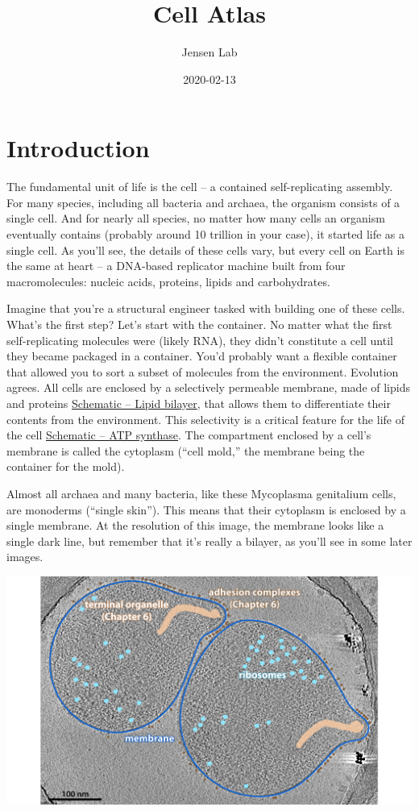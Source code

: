 \documentclass[]{tufte-book}
\title{Cell Atlas}
\author{Jensen Lab}
\date{2020-02-13}
\begin{document}
\maketitle



{
\setcounter{tocdepth}{1}
\tableofcontents
}

\hypertarget{bilayer}{\chapter{Introduction}\label{bilayer}}

The fundamental unit of life is the cell -- a contained self-replicating
assembly. For many species, including all bacteria and archaea, the
organism consists of a single cell. And for nearly all species, no
matter how many cells an organism eventually contains (probably around
10 trillion in your case), it started life as a single cell. As you'll
see, the details of these cells vary, but every cell on Earth is the
same at heart -- a DNA-based replicator machine built from four
macromolecules: nucleic acids, proteins, lipids and carbohydrates.

Imagine that you're a structural engineer tasked with building one of
these cells. What's the first step? Let's start with the container. No
matter what the first self-replicating molecules were (likely RNA), they
didn't constitute a cell until they became packaged in a container.
You'd probably want a flexible container that allowed you to sort a
subset of molecules from the environment. Evolution agrees. All cells
are enclosed by a selectively permeable membrane, made of lipids and
proteins \protect\hyperlink{bilayer}{Schematic -- Lipid bilayer}, that
allows them to differentiate their contents from the environment. This
selectivity is a critical feature for the life of the cell
\protect\hyperlink{atp}{Schematic -- ATP synthase}. The compartment
enclosed by a cell's membrane is called the cytoplasm (``cell mold,''
the membrane being the container for the mold).

Almost all archaea and many bacteria, like these Mycoplasma genitalium
cells, are monoderms (``single skin''). This means that their cytoplasm
is enclosed by a single membrane. At the resolution of this image, the
membrane looks like a single dark line, but remember that it's really a
bilayer, as you'll see in some later images.

\includegraphics{img/02_static/2_1_Mgenitalium}
\end{document}
